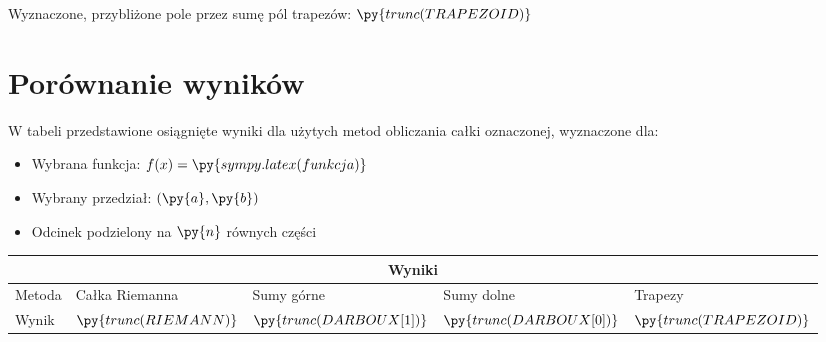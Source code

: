 \documentclass[a4paper]{article}
\begin{document}
Wyznaczone, przybliżone pole przez sumę pól trapezów: $\py{trunc(TRAPEZOID)}$

\section{Porównanie wyników}
W tabeli przedstawione osiągnięte wyniki dla użytych metod obliczania całki oznaczonej, wyznaczone dla:

\vspace{1cm}
\begin{itemize}
	\item Wybrana funkcja: $f(x) = \py{sympy.latex(funkcja)}$
	\item Wybrany przedział: $(\py{a}, \py{b})$
	\item Odcinek podzielony na $\py{n}$ równych części
\end{itemize}
	
\vspace{1cm}
\begin{tabular}{ |p{3cm}||p{3cm}|p{3cm}|p{3cm}|p{3cm}| }
	\hline
	\multicolumn{5}{|c|}{Wyniki} \\
	\hline
	Metoda &Całka Riemanna &Sumy górne &Sumy dolne &Trapezy\\
	\hline
	Wynik   &$\py{trunc(RIEMANN)}$ &$\py{trunc(DARBOUX[1])}$ &$\py{trunc(DARBOUX[0])}$ &$\py{trunc(TRAPEZOID)}$ \\
	\hline
\end{tabular}
	
\end{document}
